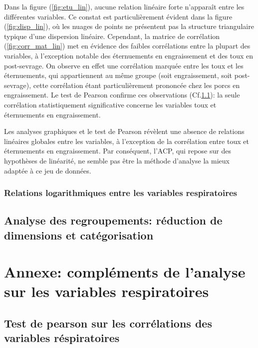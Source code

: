 \documentclass{article}
\begin{document}
Dans la figure (\ref{fig:etu_lin}), aucune relation linéaire forte n’apparaît entre les différentes variables. Ce constat est particulièrement évident dans la figure (\ref{fig:disp_lin}), où les nuages de points ne présentent pas la structure triangulaire typique d’une dispersion linéaire.
Cependant, la matrice de corrélation (\ref{fig:corr_mat_lin}) met en évidence des faibles corrélations entre la plupart des variables, à l’exception notable des éternuements en engraissement et des toux en post-sevrage. On observe en effet une corrélation marquée entre les toux et les éternuements, qui appartiennent au même groupe (soit engraissement, soit post-sevrage), cette corrélation étant particulièrement prononcée chez les porcs en engraissement.
Le test de Pearson confirme ces observations (Cf.\text{ }\ref{annexe:pearson}): la seule corrélation statistiquement significative concerne les variables toux et éternuements en engraissement.

Les analyses graphiques et le test de Pearson révèlent une absence de relations linéaires globales entre les variables, à l'exception de la corrélation entre toux et éternuements en engraissement. Par conséquent, l'ACP, qui repose sur des hypothèses de linéarité, ne semble pas être la méthode d'analyse la mieux adaptée à ce jeu de données.


\subsubsection{Relations logarithmiques entre les variables respiratoires}


\subsection{Analyse des regroupements: réduction de dimensions et catégorisation}

\newpage
\appendix

\section{Annexe: compléments de l'analyse sur les variables respiratoires}
\subsection{Test de pearson sur les corrélations des variables réspiratoires}\label{annexe:pearson}
\end{document}
